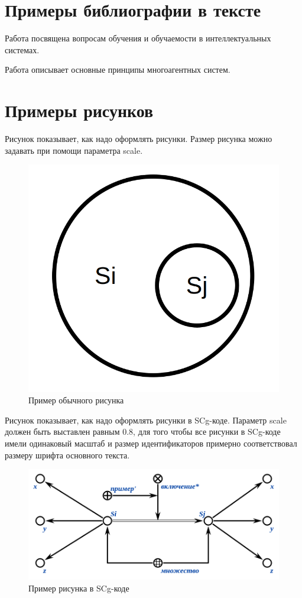 \section*{Примеры библиографии в тексте}

Работа  посвящена вопросам обучения и обучаемости в интеллектуальных системах.

Работа  описывает основные принципы многоагентных систем.

\section*{Примеры рисунков}

Рисунок \textit{} показывает, как надо оформлять рисунки. Размер рисунка можно задавать при помощи параметра scale.

\begin{figure}[H]
	\includegraphics[scale=0.5]{images/fig_example.png}
	\caption{Пример обычного рисунка}
	\label{fig:example}
\end{figure}

Рисунок \textit{} показывает, как надо оформлять рисунки в SCg-коде. Параметр scale должен быть выставлен равным 0.8, для того чтобы все рисунки в SCg-коде имели одинаковый масштаб и размер идентификаторов примерно соответствовал размеру шрифта основного текста.  

\begin{figure}[H]
	\includegraphics[scale=0.8]{images/fig_example_scg.png}
	\caption{Пример рисунка в SCg-коде}
	\label{fig:example_scg}
\end{figure}
